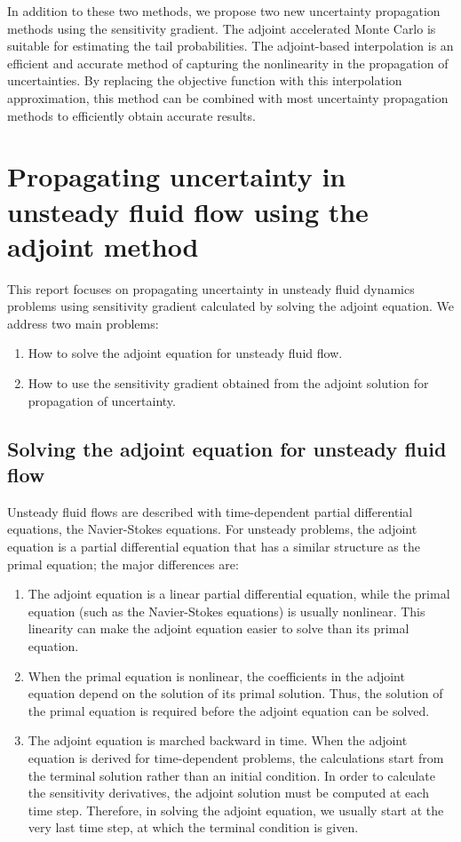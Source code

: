 In addition to these two methods, we propose two new uncertainty propagation
methods using the sensitivity gradient.  The adjoint accelerated Monte Carlo
is suitable for estimating the tail probabilities.  The adjoint-based
interpolation is an efficient and accurate method of capturing the nonlinearity
in the propagation of uncertainties.
By replacing the objective function with this interpolation approximation,
this method can be combined with most uncertainty propagation
methods to efficiently obtain accurate results.



\section{Propagating uncertainty in unsteady fluid flow using
         the adjoint method}

This report focuses on propagating uncertainty in unsteady fluid dynamics
problems using sensitivity gradient calculated by solving the adjoint equation.
We address two main problems:
\begin{enumerate}
\item How to solve the adjoint equation for unsteady fluid flow.
\item How to use the sensitivity gradient obtained from the adjoint solution
      for propagation of uncertainty.
\end{enumerate}

\subsection{Solving the adjoint equation for unsteady fluid flow}
\label{s:intro1}

Unsteady fluid flows are described with time-dependent partial
differential equations, the Navier-Stokes equations.
For unsteady problems, the adjoint equation is a partial differential
equation that has a similar structure as the primal equation;
the major differences are:
\begin{enumerate}
\item The adjoint equation is a linear partial differential equation, while
      the primal equation (such as the Navier-Stokes equations) is usually
      nonlinear.  This linearity can make the adjoint equation easier to solve
      than its primal equation.
\item When the primal equation is nonlinear, the coefficients in the adjoint
      equation depend on the solution of its primal solution.
      Thus, the solution of the primal equation is required
      before the adjoint equation can be solved.
\item The adjoint equation is marched backward in time.  When the adjoint
      equation is derived for time-dependent problems, the calculations start
      from the terminal solution rather than an initial condition.
      In order to calculate the sensitivity derivatives, the adjoint solution
      must be computed
      at each time step.  Therefore, in solving the adjoint equation, we
      usually start at the very last time step, at which the terminal condition
      is given.
\end{enumerate}

